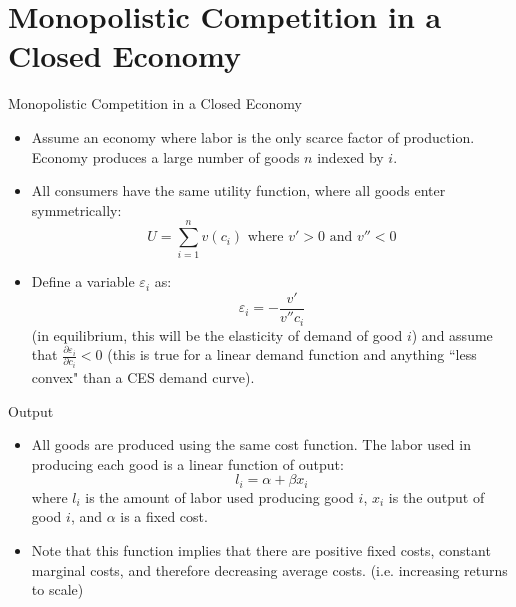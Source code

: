 \documentclass[aspectratio=169]{beamer}
\begin{document}

\section{Monopolistic Competition in a Closed Economy}


\begin{frame}{Monopolistic Competition in a Closed Economy}

\begin{itemize}
    \item<1-> Assume an economy where labor is the only scarce factor of production.  Economy produces a large number of goods $ n $ indexed by $ i $.
    \item<2-> All consumers have the same utility function, where all goods enter symmetrically:
    \begin{equation}
        U = \sum_{i = 1}^{n}{v\left( c_{i} \right)} \text{ where } v' > 0 \text{ and } v'' < 0
        \label{eq:utilityfunction}
    \end{equation}
    \item<2-> Define a variable $ \varepsilon_i $ as:
    \begin{equation*}
        \varepsilon_{i} = -\frac{v'}{v''c_{i}}
    \end{equation*}
    (in equilibrium, this will be the elasticity of demand of good $ i $) and assume that $ \frac{\partial \varepsilon_{i}}{\partial c_{i}} < 0 $ (this is true for a linear demand function and anything ``less convex" than a CES demand curve).
\end{itemize}
    
\end{frame}


\begin{frame}{Output}

\begin{itemize}
    \item<1-> All goods are produced using the same cost function.  The labor used in producing each good is a linear function of output:
    \begin{equation*}
        l_{i} = \alpha + \beta x_{i}
    \end{equation*}
    where $ l_{i} $ is the amount of labor used producing good $ i $, $ x_i $ is the output of good $ i $, and $ \alpha $ is a fixed cost.
    \item<2-> Note that this function implies that there are positive fixed costs, constant marginal costs, and therefore decreasing average costs. (i.e. increasing returns to scale)
\end{itemize}
    
\end{frame}
\end{document}
